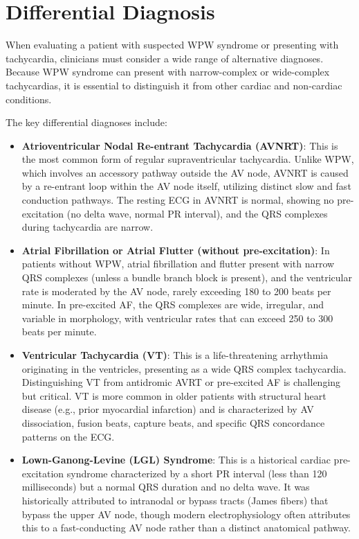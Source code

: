\section*{Differential Diagnosis}
When evaluating a patient with suspected WPW syndrome or presenting with tachycardia, clinicians must consider a wide range of alternative diagnoses. Because WPW syndrome can present with narrow-complex or wide-complex tachycardias, it is essential to distinguish it from other cardiac and non-cardiac conditions.

The key differential diagnoses include:
\begin{itemize}
  \item \textbf{Atrioventricular Nodal Re-entrant Tachycardia (AVNRT)}: This is the most common form of regular supraventricular tachycardia. Unlike WPW, which involves an accessory pathway outside the AV node, AVNRT is caused by a re-entrant loop within the AV node itself, utilizing distinct slow and fast conduction pathways. The resting ECG in AVNRT is normal, showing no pre-excitation (no delta wave, normal PR interval), and the QRS complexes during tachycardia are narrow.
  \item \textbf{Atrial Fibrillation or Atrial Flutter (without pre-excitation)}: In patients without WPW, atrial fibrillation and flutter present with narrow QRS complexes (unless a bundle branch block is present), and the ventricular rate is moderated by the AV node, rarely exceeding 180 to 200 beats per minute. In pre-excited AF, the QRS complexes are wide, irregular, and variable in morphology, with ventricular rates that can exceed 250 to 300 beats per minute.
  \item \textbf{Ventricular Tachycardia (VT)}: This is a life-threatening arrhythmia originating in the ventricles, presenting as a wide QRS complex tachycardia. Distinguishing VT from antidromic AVRT or pre-excited AF is challenging but critical. VT is more common in older patients with structural heart disease (e.g., prior myocardial infarction) and is characterized by AV dissociation, fusion beats, capture beats, and specific QRS concordance patterns on the ECG.
  \item \textbf{Lown-Ganong-Levine (LGL) Syndrome}: This is a historical cardiac pre-excitation syndrome characterized by a short PR interval (less than 120 milliseconds) but a normal QRS duration and no delta wave. It was historically attributed to intranodal or bypass tracts (James fibers) that bypass the upper AV node, though modern electrophysiology often attributes this to a fast-conducting AV node rather than a distinct anatomical pathway.

\end{itemize}
